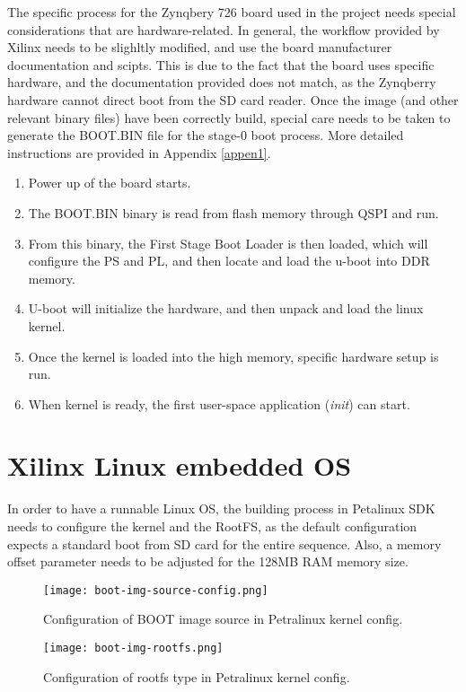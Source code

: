 The specific process for the Zynqbery 726 board used in the project needs special considerations
that are hardware-related. In general, the workflow provided by Xilinx needs to be slighltly
modified, and use the board manufacturer documentation and scipts. This is due to the fact that the
board uses specific hardware, and the documentation provided does not match, as the Zynqberry
hardware cannot direct boot from the SD card reader. Once the image (and other relevant binary
files) have been correctly build, special care needs to be taken to generate the BOOT.BIN file for
the stage-0 boot process. More detailed instructions are provided in Appendix \ref{appen1}.

\begin{enumerate}
	\item Power up of the board starts.
	\item The BOOT.BIN binary is read from flash memory through QSPI and run.
	\item From this binary, the First Stage Boot Loader is then loaded, which will configure the PS
	and PL, and then locate and load the u-boot into DDR memory.
	\item U-boot will initialize the hardware, and then unpack and load the linux kernel.
	\item Once the kernel is loaded into the high memory, specific hardware setup is run.
	\item When kernel is ready, the first user-space application (\textit{init}) can start.
\end{enumerate}

\section{Xilinx Linux embedded OS}

In order to have a runnable Linux OS, the building process in Petalinux SDK needs to configure the
kernel and the RootFS, as the default configuration expects a standard boot from SD card for the
entire sequence. Also, a memory offset parameter needs to be adjusted for the 128MB RAM memory size.

\begin{figure}[htp]
	\centering
	\texttt{[image: boot-img-source-config.png]}
	\caption{Configuration of BOOT image source in Petralinux kernel config.}
	\label{fig:boot-img-source-config}
\end{figure}

\begin{figure}[htp]
	\centering
	\texttt{[image: boot-img-rootfs.png]}
	\caption{Configuration of rootfs type in Petralinux kernel config.}
	\label{fig:boot-img-rootfs}
\end{figure}

